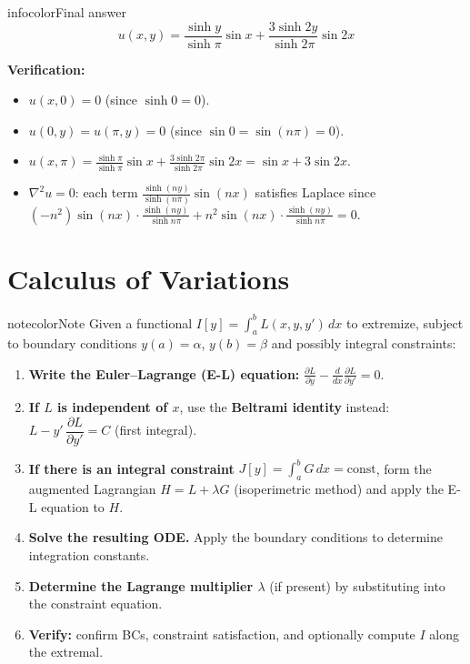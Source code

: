\documentclass[a4paper,11pt]{article} %
\newenvironment{notebox}[1][]{\begin{custombox}[#1]{notecolor}{Note}}{\end{custombox}}
\newenvironment{summarybox}[1][]{\begin{custombox}[#1]{infocolor}{Final answer}}{\end{custombox}}
\begin{document}
\begin{summarybox}
$$u(x,y) = \frac{\sinh y}{\sinh\pi}\sin x + \frac{3\sinh 2y}{\sinh 2\pi}\sin 2x$$
\end{summarybox}

\textbf{Verification:}
\begin{itemize}
    \item $u(x,0) = 0$ (since $\sinh 0 = 0$). \checkmark
    \item $u(0,y) = u(\pi,y) = 0$ (since $\sin 0 = \sin(n\pi) = 0$). \checkmark
    \item $u(x,\pi) = \frac{\sinh\pi}{\sinh\pi}\sin x + \frac{3\sinh2\pi}{\sinh2\pi}\sin 2x = \sin x + 3\sin 2x$. \checkmark
    \item $\nabla^2 u = 0$: each term $\frac{\sinh(ny)}{\sinh(n\pi)}\sin(nx)$ satisfies Laplace since $(-n^2)\sin(nx)\cdot\frac{\sinh(ny)}{\sinh n\pi} + n^2\sin(nx)\cdot\frac{\sinh(ny)}{\sinh n\pi} = 0$. \checkmark
\end{itemize}

\newpage
\section{Calculus of Variations}

\begin{notebox}[title={General Procedure: Calculus of Variations}]
Given a functional $I[y]=\int_a^b L(x,y,y')\,dx$ to extremize, subject to boundary conditions $y(a)=\alpha$, $y(b)=\beta$ and possibly integral constraints:
\begin{enumerate}
    \item \textbf{Write the Euler--Lagrange (E-L) equation:}
    $\displaystyle\frac{\partial L}{\partial y} - \frac{d}{dx}\frac{\partial L}{\partial y'} = 0.$
    \item \textbf{If $L$ is independent of $x$}, use the \textbf{Beltrami identity} instead: $L - y'\,\dfrac{\partial L}{\partial y'} = C$ (first integral).
    \item \textbf{If there is an integral constraint} $J[y]=\int_a^b G\,dx = \text{const}$, form the augmented Lagrangian $H = L + \lambda G$ (isoperimetric method) and apply the E-L equation to $H$.
    \item \textbf{Solve the resulting ODE.} Apply the boundary conditions to determine integration constants.
    \item \textbf{Determine the Lagrange multiplier $\lambda$} (if present) by substituting into the constraint equation.
    \item \textbf{Verify:} confirm BCs, constraint satisfaction, and optionally compute $I$ along the extremal.
\end{enumerate}
\end{notebox}
\end{document}
